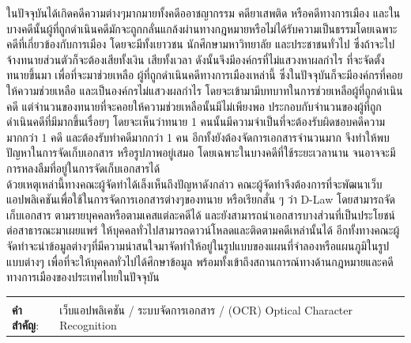 \documentclass[12pt,oneside,openright,a4paper]{cpe-thai-project}
\begin{document}
\hspace*{1cm} ในปัจจุบันได้เกิดคดีความต่างๆมากมายทั้งคดีออาชญากรรม คดียาเสพติด หรือคดีทางการเมือง และในบางคดีนั้นผู้ที่ถูกดำเนินคดีมักจะถูกกลั่นแกล้งผ่านทางกฎหมายหรือไม่ได้รับความเป็นธรรมโดยเฉพาะคดีที่เกี่ยวข้องกับการเมือง โดยจะมีทั้งเยาวชน นักศึกษามหาวิทยาลัย และประชาชนทั่วไป ซึ่งถ้าจะไปจ้างทนายส่วนตัวก็จะต้องเสียทั้งเงิน เสียทั้งเวลา ดังนั้นจึงมีองค์กรที่ไม่แสวงหาผลกำไร ที่จะจัดตั้งทนายขึ้นมา เพื่อที่จะมาช่วยเหลือ ผู้ที่ถูกดำเนินคดีทางการเมืองเหล่านี้ ซึ่งในปัจจุบันก็จะมีองค์กรที่คอยให้ความช่วยเหลือ และเป็นองค์กรไม่แสวงผลกำไร โดยจะเข้ามามีบทบาทในการช่วยเหลือผู้ที่ถูกดำเนินคดี แต่จำนวนของทนายที่จะคอยให้ความช่วยเหลือนั้นมีไม่เพียงพอ ประกอบกับจำนวนของผู้ที่ถูกดำเนินคดีที่มีมากขึ้นเรื่อยๆ โดยจะเห็นว่าทนาย 1 คนนั้นมีความจำเป็นที่จะต้องรับผิดชอบคดีความมากกว่า 1 คดี และต้องรับทำคดีมากกว่า 1 คน อีกทั้งยังต้องจัดการเอกสารจำนวนมาก จึงทำให้พบปัญหาในการจัดเก็บเอกสาร หรือรูปภาพอยู่เสมอ โดยเฉพาะในบางคดีที่ใช้ระยะเวลานาน จนอาจจะมีการหลงลืมที่อยู่ในการจัดเก็บเอกสารได้ \\
\hspace*{1cm} ด้วยเหตุเหล่านี้ทางคณะผู้จัดทำได้เล็งเห็นถึงปัญหาดังกล่าว คณะผู้จัดทำจึงต้องการที่จะพัฒนาเว็บแอปพลิเคชันเพื่อใช้ในการจัดการเอกสารต่างๆของทนาย หรือเรียกสั่น ๆ ว่า D-Law โดยสามารถจัดเก็บเอกสาร ตามรายบุคคลหรือตามเคสแต่ละคดีได้ และยังสามารถนำเอกสารบางส่วนที่เป็นประโยชน์ต่อสาธารณะมาเผยแพร่ ให้บุคคลทั่วไปสามารถดาวน์โหลดและติดตามคดีเหล่านั้นได้ อีกทั้งทางคณะผู้จัดทำจะนำข้อมูลต่างๆที่มีความน่าสนใจมาจัดทำให้อยู่ในรูปแบบของแผนที่จำลองหรือแผนภูมิในรูปแบบต่างๆ เพื่อที่จะให้บุคคลทั่วไปได้ศึกษาข้อมูล พร้อมทั้งเข้าถึงสถานการณ์ทางด้านกฎหมายและคดีทางการเมืองของประเทศไทยในปัจจุบัน


\begin{flushleft}
\begin{tabular*}{\textwidth}{@{}lp{}}
 & \\

\textbf{คำสำคัญ}: & เว็บแอปพลิเคชัน / ระบบจัดการเอกสาร / (OCR) Optical Character Recognition
\end{tabular*}
\end{flushleft}
\endabstract

\end{document}
